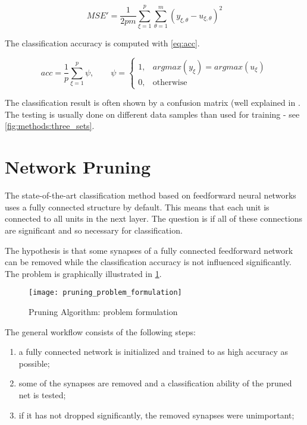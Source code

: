 \begin{equation} \label{eq:mse_}
MSE' = \frac{1}{2 p m} \displaystyle \sum^{p}_{\xi=1} \displaystyle \sum^{m}_{\theta=1} (y_{\xi,\theta} - u_{\xi,\theta})^2
\end{equation}

The classification accuracy is computed with \ref{eq:acc}.

\begin{equation} \label{eq:acc}
acc = \frac{1}{p} \displaystyle \sum^{p}_{\xi=1} \psi, \qquad \psi = \begin{cases}
    1, & argmax(y_{\xi}) = argmax(u_{\xi}) \\
    0, & \text{otherwise}
\end{cases} 
\end{equation}

The classification result is often shown by a confusion matrix (well explained in \citep{sklearn}. The testing is usually done on different data samples than used for training - see \cref{fig:methods:three_sets}.

\section{Network Pruning} \label{sec:network_pruning}
The state-of-the-art classification method based on feedforward neural networks uses a fully connected structure by default. This means that each unit is connected to all units in the next layer. The question is if all of these connections are significant and so necessary for classification.

The hypothesis is that some synapses of a fully connected feedforward network can be removed while the classification accuracy is not influenced significantly. The problem is graphically illustrated in \cref{fig:methods:pruning_problem_formulation}.

\begin{figure}[H]
  \centering
  \texttt{[image: pruning\_problem\_formulation]}
  \caption{Pruning Algorithm: problem formulation}
  \label{fig:methods:pruning_problem_formulation}
\end{figure}

The general workflow consists of the following steps:
\begin{enumerate}
\item a fully connected network is initialized and trained to as high accuracy as possible;
\item some of the synapses are removed and a classification ability of the pruned net is tested;
\item if it has not dropped significantly, the removed synapses were unimportant;
\end{enumerate}

